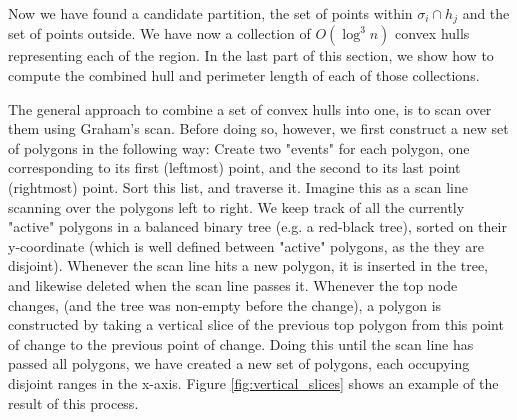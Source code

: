 \documentclass{article}
\begin{document}
Now we have found a candidate partition, the set of points within $\sigma_i \cap h_j$ and the set of points outside. We have now a collection of $O(\log^3 n)$ convex hulls representing each of the region. In the last part of this section, we show how to compute the combined hull and perimeter length of each of those collections. 

The general approach to combine a set of convex hulls into one, is to scan over them using Graham's scan. Before doing so, however, we first construct a new set of polygons in the following way: Create two "events" for each polygon, one corresponding to its first (leftmost) point, and the second to its last point (rightmost) point. Sort this list, and traverse it. Imagine this as a scan line scanning over the polygons left to right. We keep track of all the currently "active" polygons in a balanced binary tree (e.g. a red-black tree), sorted on their y-coordinate (which is well defined between "active" polygons, as the they are disjoint). Whenever the scan line hits a new polygon, it is inserted in the tree, and likewise deleted when the scan line passes it. Whenever the top node changes, (and the tree was non-empty before the change), a polygon is constructed by taking a vertical slice of the previous top polygon from this point of change to the previous point of change. Doing this until the scan line has passed all polygons, we have created a new set of polygons, each occupying disjoint ranges in the x-axis. Figure \ref{fig:vertical_slices} shows an example of the result of this process.
\end{document}
